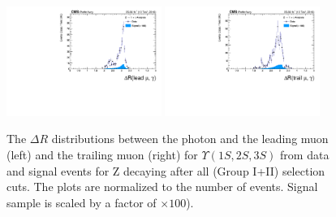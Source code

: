 \begin{figure}[!htbp]
\begin{center}
\includegraphics[width=0.45\textwidth]{figures/outputPlots/ZtoUpsilon_Cat0_ZZZZZ/nEvts/data_x_mc/withKinCuts/h_withKin_deltaR_Leading_Photon}\hspace*{1.cm}
\includegraphics[width=0.45\textwidth]{figures/outputPlots/ZtoUpsilon_Cat0_ZZZZZ/nEvts/data_x_mc/withKinCuts/h_withKin_deltaR_Trailing_Photon}\end{center}\vspace*{-.5cm}
\caption{The $\Delta R$ distributions between the photon and the leading muon (left) and the trailing muon (right) for $\Upsilon(1S,2S,3S)$ from data and signal events for Z decaying after all (Group I+II) selection cuts. The plots are normalized to the number of events. Signal sample is scaled by a factor of $\times 100$).}
\label{fig:deltaR_ZtoUpsilon_Cat0_groupI_plus_II}
\end{figure}


